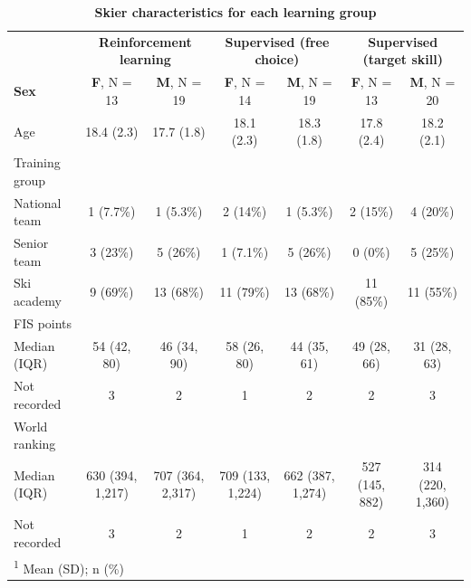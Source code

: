 \documentclass[pdflatex,sn-nature]{sn-jnl}%
\theoremstyle{thmstyleone}%
\theoremstyle{thmstyletwo}%
\theoremstyle{thmstylethree}%
\begin{document}
\begin{table}
\label{tab:descriptive_skier}
\caption{\textbf{Skier characteristics for each learning group}}
\centering
\begin{tabular}[H]{l|c|c|c|c|c|c}
\hline
\multicolumn{1}{c|}{ } & \multicolumn{2}{c|}{\textbf{Reinforcement learning}} & \multicolumn{2}{c|}{\textbf{Supervised (free choice)}} & \multicolumn{2}{c}{\textbf{Supervised (target skill)}} \\
\textbf{Sex} & \textbf{F}, N = 13 & \textbf{M}, N = 19 & \textbf{F}, N = 14 & \textbf{M}, N = 19 & \textbf{F}, N = 13 & \textbf{M}, N = 20\\
\hline
Age & 18.4 (2.3) & 17.7 (1.8) & 18.1 (2.3) & 18.3 (1.8) & 17.8 (2.4) & 18.2 (2.1)\\
\hline
Training group &  &  &  &  &  & \\
\hline
\hspace{1em}National team & 1 (7.7\%) & 1 (5.3\%) & 2 (14\%) & 1 (5.3\%) & 2 (15\%) & 4 (20\%)\\
\hline
\hspace{1em}Senior team & 3 (23\%) & 5 (26\%) & 1 (7.1\%) & 5 (26\%) & 0 (0\%) & 5 (25\%)\\
\hline
\hspace{1em}Ski academy & 9 (69\%) & 13 (68\%) & 11 (79\%) & 13 (68\%) & 11 (85\%) & 11 (55\%)\\
\hline
FIS points &  &  &  &  &  & \\
\hline
\hspace{1em}Median (IQR) & 54 (42, 80) & 46 (34, 90) & 58 (26, 80) & 44 (35, 61) & 49 (28, 66) & 31 (28, 63)\\
\hline
\hspace{1em}Not recorded & 3 & 2 & 1 & 2 & 2 & \vphantom{1} 3\\
\hline
World ranking &  &  &  &  &  & \\
\hline
\hspace{1em}Median (IQR) & 630 (394, 1,217) & 707 (364, 2,317) & 709 (133, 1,224) & 662 (387, 1,274) & 527 (145, 882) & 314 (220, 1,360)\\
\hline
\hspace{1em}Not recorded & 3 & 2 & 1 & 2 & 2 & 3\\
\hline
\multicolumn{7}{l}{\rule{0pt}{1em}\textsuperscript{1} Mean (SD); n (\%)}\\
\end{tabular}
\end{table}
\end{document}
